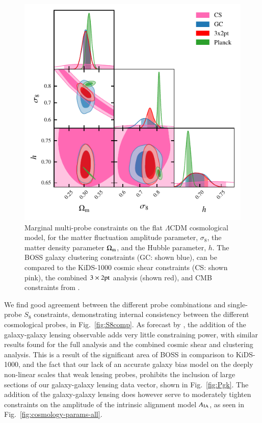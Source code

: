 \begin{figure}
	\begin{center}
		\includegraphics[width=\columnwidth]{Parameter_Plots/cosmology/omegam_sigma8_h_blind_C}
		\caption{Marginal multi-probe constraints on the flat $\Lambda$CDM cosmological model, for the matter fluctuation amplitude parameter, $\sigma_8$, the matter density parameter $\Omega_{\rm m}$, and the Hubble parameter, $h$.  The BOSS galaxy clustering constraints (GC: shown blue), can be compared to the KiDS-1000 cosmic shear constraints (CS: shown pink), the combined $3\times2{\rm pt}$ analysis (shown red), and CMB constraints from \citet{planck/etal:2018}.}
		\label{fig:cosmology-params}
	\end{center}
\end{figure}

We find good agreement between the different probe combinations and single-probe $S_8$ constraints, demonstrating internal consistency between the different cosmological probes, in Fig.~\ref{fig:S8comp}.  
As forecast by \citet{joachimi/etal:inprep}, the addition of the galaxy-galaxy lensing observable adds very little constraining power, with similar results found for the full \tttp analysis and the combined cosmic shear and clustering analysis. 
This is a result of the significant area of BOSS in comparison to KiDS-1000, and the fact that our lack of an accurate galaxy bias model on the deeply non-linear scales that weak lensing probes,
prohibits the inclusion of large sections of our galaxy-galaxy lensing data vector, shown in Fig.~\ref{fig:Pgk}.  
The addition of the galaxy-galaxy lensing does however serve to moderately tighten constraints on the amplitude of the intrinsic alignment model $A_{\rm IA}$,  as seen in Fig.~\ref{fig:cosmology-params-all}. 

